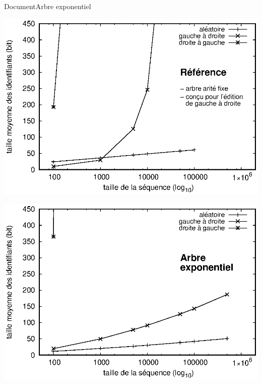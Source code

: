 \begin{frame}{Document}{Arbre exponentiel}
  \vspace{0.5cm}\hspace{-1cm}
  \begin{minipage}{0.45\textwidth}
    \includegraphics[width=1.25\textwidth]{img/replication/logoot.eps}
  \end{minipage}
  \hspace{1.5cm}
  \begin{minipage}{0.45\textwidth}
    \includegraphics[width=1.25\textwidth]{img/replication/double.eps}
  \end{minipage}    

\end{frame}


